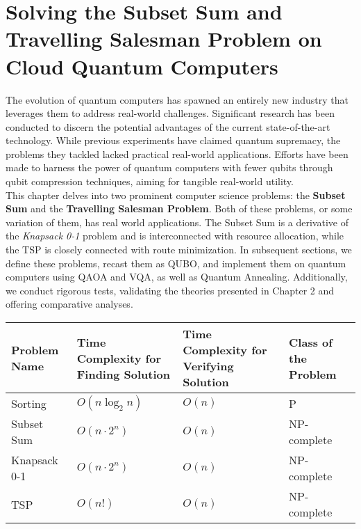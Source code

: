 \documentclass[12pt,a4paper]{report}
\begin{document}
\chapter{Solving the Subset Sum and Travelling Salesman Problem on Cloud Quantum Computers}
\noindent
The evolution of quantum computers has spawned an entirely new industry that leverages them to address real-world challenges. Significant research has been conducted to discern the potential advantages of the current state-of-the-art technology. While previous experiments have claimed quantum supremacy, the problems they tackled lacked practical real-world applications. Efforts have been made to harness the power of quantum computers with fewer qubits through qubit compression techniques, aiming for tangible real-world utility.
\\

\noindent
This chapter delves into two prominent computer science problems: the \textbf{Subset Sum} and the \textbf{Travelling Salesman Problem}. Both of these problems, or some variation of them, has real world applications. The Subset Sum is a derivative of the \textit{Knapsack 0-1} problem and is interconnected with resource allocation, while the TSP is closely connected with route minimization. In subsequent sections, we define these problems, recast them as QUBO, and implement them on quantum computers using QAOA and VQA, as well as Quantum Annealing. Additionally, we conduct rigorous tests, validating the theories presented in Chapter 2 and offering comparative analyses.
\\


\begin{tcolorbox}
    \centering
    \small %
    \begin{tabular}{>{\centering\arraybackslash}m{4cm} >{\centering\arraybackslash}m{3cm} >{\centering\arraybackslash}m{3cm} >{\centering\arraybackslash}m{3cm}}
        \textbf{Problem Name} & \textbf{Time Complexity for Finding Solution} & \textbf{Time Complexity for Verifying Solution} & \textbf{Class of the Problem} \\ \hline
        Sorting & \( O(n \log_{2} n) \) & \( O(n)\) & P \\
        Subset Sum & \(O(n \cdot 2^n)\) & \( O(n)\) & NP-complete \\
        Knapsack 0-1 & \(O(n \cdot 2^n)\) & \( O(n)\) & NP-complete \\
        TSP & \(O(n!)\) & \(O(n)\) & NP-complete \\
    \end{tabular}
    \label{table:problems}
\end{tcolorbox}
\end{document}
